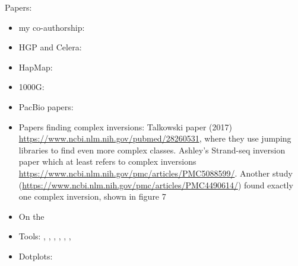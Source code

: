 Papers:
\begin{itemize}
\item my co-authorship: \citep{Sudmant2015}
\item HGP and Celera: \citep{Lander2001,Venter2001}
\item HapMap: \citep{InternationalHapMapConsortium2005,Frazer2007,Altshuler2010}
\item 1000G: \citep{Durbin2010,1000GenomesProjectConsortium2012,Auton2015}
\item PacBio papers: \citep{Chaisson2014,Pendleton2015}
\item Papers finding complex inversions: Talkowski paper (2017)
    \url{https://www.ncbi.nlm.nih.gov/pubmed/28260531}, where they use jumping
    libraries to find even more complex classes. Ashley's Strand-seq inversion
    paper which at least refers to complex inversions
    \url{https://www.ncbi.nlm.nih.gov/pmc/articles/PMC5088599/}. Another study
    (\url{https://www.ncbi.nlm.nih.gov/pmc/articles/PMC4490614/}) found exactly
    one complex inversion, shown in figure 7
\item On the

\item Tools: \blasr, \last, \mummer, \bwamem, \quiver, \celeraassembler, \maze
\item Dotplots: \citep{Fitch1969,Gibbs1970}
\end{itemize}
